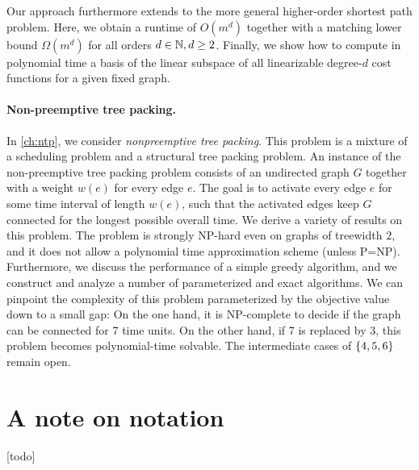 Our approach furthermore extends to the more general higher-order shortest path problem. Here, we obtain a runtime of $O(m^d)$ together with a matching lower bound $\Omega(m^d)$ for all orders $d \in \mathbb{N}, d \geq 2$. 
Finally, we show how to compute in polynomial time a basis of the linear subspace of all linearizable degree-$d$ cost functions for a given fixed graph.

\paragraph*{Non-preemptive tree packing.}
In \cref{ch:ntp}, we consider \emph{nonpreemptive tree packing}. This problem is a mixture of a scheduling problem and a structural tree packing problem.
An instance of the non-preemptive tree packing problem consists of an undirected graph $G$ together with a weight $w(e)$ for every edge $e$. The goal is to activate every edge $e$ for some time interval of length $w(e)$, such that the activated edges keep $G$ connected for the longest possible overall time. We derive a variety of results on this problem. The problem is strongly NP-hard even on graphs of treewidth $2$, and it does not allow a polynomial time approximation scheme (unless P=NP). Furthermore, we discuss the performance of a simple greedy algorithm, and we construct and analyze a number of parameterized and exact algorithms.
We can pinpoint the complexity of this problem parameterized by the objective value down to a small gap: On the one hand, it is NP-complete to decide if the graph can be connected for 7 time units. On the other hand, if 7 is replaced by 3, this problem becomes polynomial-time solvable. The intermediate cases of $\{ 4,5,6 \}$ remain open.

\section{A note on notation}

[todo]